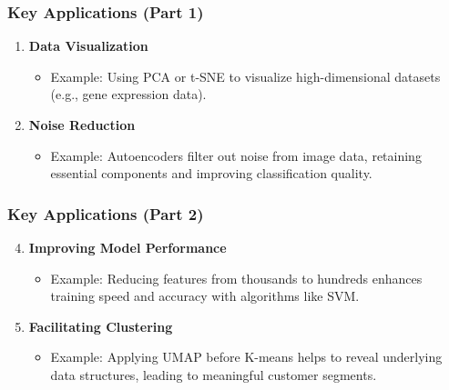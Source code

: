 \documentclass[aspectratio=169]{beamer}
\begin{document}
\begin{frame}[fragile]
    \frametitle{Key Applications (Part 1)}
    \begin{enumerate}
        \item \textbf{Data Visualization} 
            \begin{itemize}
                \item Example: Using PCA or t-SNE to visualize high-dimensional datasets (e.g., gene expression data).
            \end{itemize}
        
        \item \textbf{Noise Reduction}
            \begin{itemize}
                \item Example: Autoencoders filter out noise from image data, retaining essential components and improving classification quality.
            \end{itemize}
    \end{enumerate}
\end{frame}

\begin{frame}[fragile]
    \frametitle{Key Applications (Part 2)}
    \begin{enumerate}
        \setcounter{enumi}{3} %
        \item \textbf{Improving Model Performance}
            \begin{itemize}
                \item Example: Reducing features from thousands to hundreds enhances training speed and accuracy with algorithms like SVM.
            \end{itemize}

        \item \textbf{Facilitating Clustering}
            \begin{itemize}
                \item Example: Applying UMAP before K-means helps to reveal underlying data structures, leading to meaningful customer segments.
            \end{itemize}
    \end{enumerate}
\end{frame}
\end{document}
